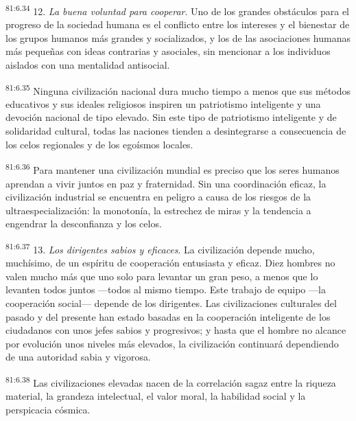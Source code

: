 \documentclass[twoside, 11pt]{book}
\begin{document}
\par
\textsuperscript{81:6.34} 12. \textit{La buena voluntad para cooperar}. Uno de los grandes obstáculos para el progreso de la sociedad humana es el conflicto entre los intereses y el bienestar de los grupos humanos más grandes y socializados, y los de las asociaciones humanas más pequeñas con ideas contrarias y asociales, sin mencionar a los individuos aislados con una mentalidad antisocial.

\par
\textsuperscript{81:6.35} Ninguna civilización nacional dura mucho tiempo a menos que sus métodos educativos y sus ideales religiosos inspiren un patriotismo inteligente y una devoción nacional de tipo elevado. Sin este tipo de patriotismo inteligente y de solidaridad cultural, todas las naciones tienden a desintegrarse a consecuencia de los celos regionales y de los egoísmos locales.

\par
\textsuperscript{81:6.36} Para mantener una civilización mundial es preciso que los seres humanos aprendan a vivir juntos en paz y fraternidad. Sin una coordinación eficaz, la civilización industrial se encuentra en peligro a causa de los riesgos de la ultraespecialización: la monotonía, la estrechez de miras y la tendencia a engendrar la desconfianza y los celos.

\par
\textsuperscript{81:6.37} 13. \textit{Los dirigentes sabios y eficaces}. La civilización depende mucho, muchísimo, de un espíritu de cooperación entusiasta y eficaz. Diez hombres no valen mucho más que uno solo para levantar un gran peso, a menos que lo levanten todos juntos ---todos al mismo tiempo. Este trabajo de equipo ---la cooperación social--- depende de los dirigentes. Las civilizaciones culturales del pasado y del presente han estado basadas en la cooperación inteligente de los ciudadanos con unos jefes sabios y progresivos; y hasta que el hombre no alcance por evolución unos niveles más elevados, la civilización continuará dependiendo de una autoridad sabia y vigorosa.

\par
\textsuperscript{81:6.38} Las civilizaciones elevadas nacen de la correlación sagaz entre la riqueza material, la grandeza intelectual, el valor moral, la habilidad social y la perspicacia cósmica.
\end{document}
